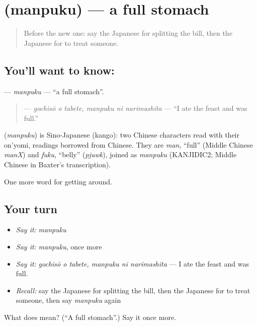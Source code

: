 \section[\texorpdfstring{\ja{まんぷく} (manpuku)}{まんぷく (manpuku)}]{ (manpuku) — a full stomach}

\label{lesson:JA-C423-manpuku}



\begin{quote}
Before the new one: say the Japanese for splitting the bill, then the Japanese for to treat someone.
\end{quote}

\subsection*{You'll want to know: }
\textbf{} — \emph{manpuku} — \textquotedblleft{}a full stomach\textquotedblright{}.

\begin{quote}
\textbf{  } — \emph{gochisō o tabete, manpuku ni narimashita} — \textquotedblleft{}I ate the feast and was full.\textquotedblright{}
\end{quote}

\begin{cousinweb}
\textbf{} (\emph{manpuku}) is Sino-Japanese (kango): two Chinese characters read with their on'yomi, readings borrowed from Chinese. They are \emph{man}, \textquotedblleft{}full\textquotedblright{} (Middle Chinese \emph{manX}) and \emph{fuku}, \textquotedblleft{}belly\textquotedblright{} (\emph{pjuwk}), joined as \emph{manpuku} (KANJIDIC2; Middle Chinese in Baxter's transcription).
\end{cousinweb}

\begin{grammarlens}[title={What you've built}]
One more word for getting around.
\end{grammarlens}

\subsection*{Your turn}
\begin{itemize}
\raggedright
  \item \emph{Say it:} \emph{manpuku}
  \item \emph{Say it:} \emph{manpuku}, once more
  \item \emph{Say it:} \emph{gochisō o tabete, manpuku ni narimashita} — I ate the feast and was full.
  \item \emph{Recall:} say the Japanese for splitting the bill, then the Japanese for to treat someone, then say \emph{manpuku} again
\end{itemize}

\begin{tcolorbox}[breakable,colback=teal!4,colframe=teal!35!black,title={Before you move on}]
What does  mean? (\textquotedblleft{}A full stomach\textquotedblright{}.) Say it once more.
\end{tcolorbox}
